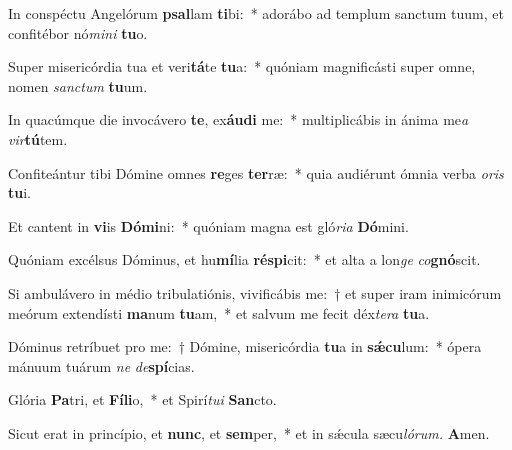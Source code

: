 \item In conspéctu Angelórum \textbf{psal}lam \textbf{ti}bi:~* adorábo ad templum sanctum tuum, et confitébor nó\textit{mini} \textbf{tu}o.
\item Super misericórdia tua et veri\textbf{tá}te \textbf{tu}a:~* quóniam magnificásti super omne, nomen \textit{sanctum} \textbf{tu}um.
\item In quacúmque die invocávero \textbf{te}, ex\textbf{áu}\textbf{di} me:~* multiplicábis in ánima me\tinyhspace\textit{a} \textit{vir}\textbf{tú}tem.
\item Confiteántur tibi Dómine omnes \textbf{re}ges \textbf{ter}ræ:~* quia audiérunt ómnia verba \textit{oris} \textbf{tu}i.
\item Et cantent in \textbf{vi}is \textbf{Dó}\textbf{mi}ni:~* quóniam magna est gló\textit{ria} \textbf{Dó}mini.
\item Quóniam excélsus Dóminus, et hu\textbf{mí}lia \textbf{ré}\textbf{spi}cit:~* et alta a lon\textit{ge} \textit{co}\textbf{gnó}scit.
\item Si ambulávero in médio tribulatiónis, vivificábis me:~† et super iram inimicórum meórum extendísti \textbf{ma}num \textbf{tu}am,~* et salvum me fecit déx\hspace*{0.01em}\textit{tera} \textbf{tu}a.
\item Dóminus retríbuet pro me:~† Dómine, misericórdia \textbf{tu}a in \textbf{sǽ}\textbf{cu}lum:~* ópera mánuum tuárum \textit{ne} \textit{de}\textbf{spí}cias.
\item Glória \textbf{Pa}tri, et \textbf{Fí}\textbf{li}o,~* et Spirí\tinyhspace\textit{tui} \textbf{San}cto.
\item Sicut erat in princípio, et \textbf{nunc}, et \textbf{sem}per,~* et in sǽcula sæcu\tinyhspace\textit{lórum.} \textbf{A}men.